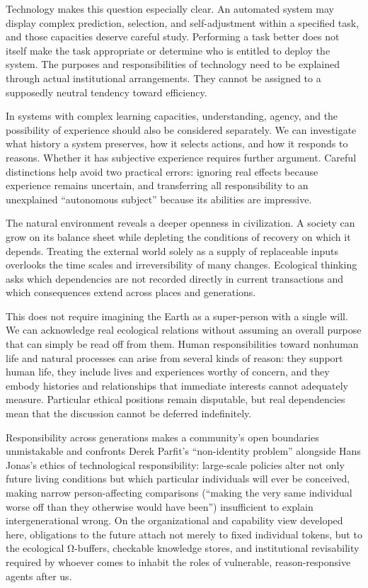 \documentclass[
  english,
  11pt,
  oneside]{book}
\begin{document}
Technology makes this question especially clear. An automated system may display complex prediction, selection, and self-adjustment within a specified task, and those capacities deserve careful study. Performing a task better does not itself make the task appropriate or determine who is entitled to deploy the system. The purposes and responsibilities of technology need to be explained through actual institutional arrangements. They cannot be assigned to a supposedly neutral tendency toward efficiency.

In systems with complex learning capacities, understanding, agency, and the possibility of experience should also be considered separately. We can investigate what history a system preserves, how it selects actions, and how it responds to reasons. Whether it has subjective experience requires further argument. Careful distinctions help avoid two practical errors: ignoring real effects because experience remains uncertain, and transferring all responsibility to an unexplained ``autonomous subject'' because its abilities are impressive.

The natural environment reveals a deeper openness in civilization. A society can grow on its balance sheet while depleting the conditions of recovery on which it depends. Treating the external world solely as a supply of replaceable inputs overlooks the time scales and irreversibility of many changes. Ecological thinking asks which dependencies are not recorded directly in current transactions and which consequences extend across places and generations.

This does not require imagining the Earth as a super-person with a single will. We can acknowledge real ecological relations without assuming an overall purpose that can simply be read off from them. Human responsibilities toward nonhuman life and natural processes can arise from several kinds of reason: they support human life, they include lives and experiences worthy of concern, and they embody histories and relationships that immediate interests cannot adequately measure. Particular ethical positions remain disputable, but real dependencies mean that the discussion cannot be deferred indefinitely.

Responsibility across generations makes a community's open boundaries unmistakable and confronts Derek Parfit's ``non-identity problem'' alongside Hans Jonas's ethics of technological responsibility: large-scale policies alter not only future living conditions but which particular individuals will ever be conceived, making narrow person-affecting comparisons (``making the very same individual worse off than they otherwise would have been'') insufficient to explain intergenerational wrong. On the organizational and capability view developed here, obligations to the future attach not merely to fixed individual tokens, but to the ecological Ω-buffers, checkable knowledge stores, and institutional revisability required by whoever comes to inhabit the roles of vulnerable, reason-responsive agents after us.
\end{document}
